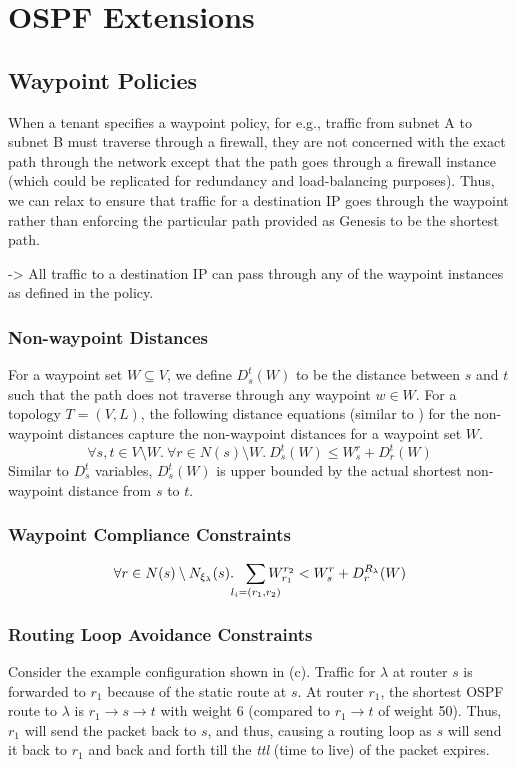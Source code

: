 \section{OSPF Extensions}
\subsection{Waypoint Policies}
When a tenant specifies a waypoint policy, for e.g., traffic from
subnet A to subnet B must traverse through a firewall, they are not
concerned with the exact path through the network except that the 
path goes through a firewall instance (which could be replicated for
redundancy and load-balancing purposes). 
Thus, we can relax 
to ensure that traffic for a destination IP goes 
through the waypoint rather than 
enforcing the particular path provided as Genesis 
to be the shortest path. 

-> All traffic to a destination IP can pass through any of the
waypoint instances as defined in the policy.

\subsubsection{Non-waypoint Distances}
For a waypoint set $W \subseteq V$, we define $D_s^t(W)$ to be the 
distance between $s$ and $t$ such that the path does not
 traverse through any waypoint $w \in W$. For a topology 
 $T = (V,L)$, the following distance equations (similar to 
 ) for the non-waypoint distances capture the
 non-waypoint distances for a waypoint set $W$.
\begin{equation} \label{eq:dist}
\forall s, t \in V \setminus W. ~\forall r \in N(s) \setminus W.~
D_s^t(W) \leq W_s^r + D_r^t(W)
\end{equation}
Similar to $D_s^t$ variables, $D_s^t(W)$ is upper bounded by the
actual shortest non-waypoint distance from $s$ to $t$.

\subsubsection{Waypoint Compliance Constraints}

\begin{equation} \label{eq:waypoint}
\forall r \in N(s) \setminus N_{\xi_\lambda}(s).~~ \sum_{\mathclap{\substack{l_i=(r_1,r_2)}}} 
W_{r_1}^{r_2} < 
W_{s}^{r}+ D_{r}^{R_\lambda}(W) 
\end{equation}

\subsubsection{Routing Loop Avoidance Constraints} \label{sec:loopavoidance}
Consider the example configuration shown in (c). 
Traffic for $\lambda$ at router $s$ is forwarded to $r_1$ because of the
static route at $s$. At router $r_1$, the shortest OSPF route to
$\lambda$ is $r_1 \rightarrow s \rightarrow t$ with weight 6 (compared 
to $r_1 \rightarrow t$ of weight 50). Thus, $r_1$ will send the 
packet back to $s$, and thus, causing a routing loop as $s$ will send
it back to $r_1$ and back and forth till the \emph{ttl} (time to live) of the
packet expires. 

